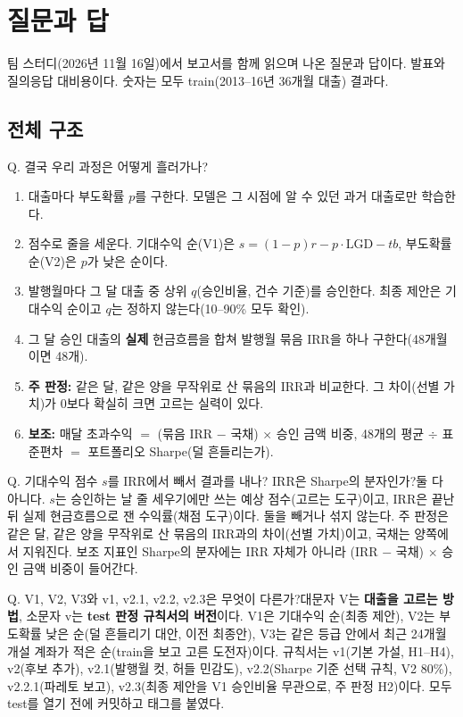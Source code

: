 \chapter{질문과 답}
\newcommand{\QA}[2]{\begin{qa}{Q. #1}#2\end{qa}}

팀 스터디(2026년 11월 16일)에서 보고서를 함께 읽으며 나온 질문과 답이다. 발표와 질의응답 대비용이다. 숫자는 모두 train(2013--16년 36개월 대출) 결과다.

\section{전체 구조}
\QA{결국 우리 과정은 어떻게 흘러가나?}{
\begin{enumerate}[leftmargin=*]
\item 대출마다 부도확률 $p$를 구한다. 모델은 그 시점에 알 수 있던 과거 대출로만 학습한다.
\item 점수로 줄을 세운다. 기대수익 순(V1)은 $s=(1-p)r-p\cdot\mathrm{LGD}-tb$, 부도확률 순(V2)은 $p$가 낮은 순이다.
\item 발행월마다 그 달 대출 중 상위 $q$(승인비율, 건수 기준)를 승인한다. 최종 제안은 기대수익 순이고 $q$는 정하지 않는다(10--90\% 모두 확인).
\item 그 달 승인 대출의 \textbf{실제} 현금흐름을 합쳐 발행월 묶음 IRR을 하나 구한다(48개월이면 48개).
\item \textbf{주 판정:} 같은 달, 같은 양을 무작위로 산 묶음의 IRR과 비교한다. 그 차이(선별 가치)가 0보다 확실히 크면 고르는 실력이 있다.
\item \textbf{보조:} 매달 초과수익 $=$ (묶음 IRR $-$ 국채) \ensuremath{\times} 승인 금액 비중, 48개의 평균 \ensuremath{\div} 표준편차 $=$ 포트폴리오 Sharpe(덜 흔들리는가).
\end{enumerate}}

\QA{기대수익 점수 $s$를 IRR에서 빼서 결과를 내나? IRR은 Sharpe의 분자인가?}{둘 다 아니다. $s$는 승인하는 날 줄 세우기에만 쓰는 예상 점수(고르는 도구)이고, IRR은 끝난 뒤 실제 현금흐름으로 잰 수익률(채점 도구)이다. 둘을 빼거나 섞지 않는다. 주 판정은 같은 달, 같은 양을 무작위로 산 묶음의 IRR과의 차이(선별 가치)이고, 국채는 양쪽에서 지워진다. 보조 지표인 Sharpe의 분자에는 IRR 자체가 아니라 (IRR $-$ 국채) \ensuremath{\times} 승인 금액 비중이 들어간다.}

\QA{V1, V2, V3와 v1, v2.1, v2.2, v2.3은 무엇이 다른가?}{대문자 V는 \textbf{대출을 고르는 방법}, 소문자 v는 \textbf{test 판정 규칙서의 버전}이다. V1은 기대수익 순(최종 제안), V2는 부도확률 낮은 순(덜 흔들리기 대안, 이전 최종안), V3는 같은 등급 안에서 최근 24개월 개설 계좌가 적은 순(train을 보고 고른 도전자)이다. 규칙서는 v1(기본 가설, H1--H4), v2(후보 추가), v2.1(발행월 컷, 허들 민감도), v2.2(Sharpe 기준 선택 규칙, V2 80\%), v2.2.1(파레토 보고), v2.3(최종 제안을 V1 승인비율 무관으로, 주 판정 H2)이다. 모두 test를 열기 전에 커밋하고 태그를 붙였다.}

